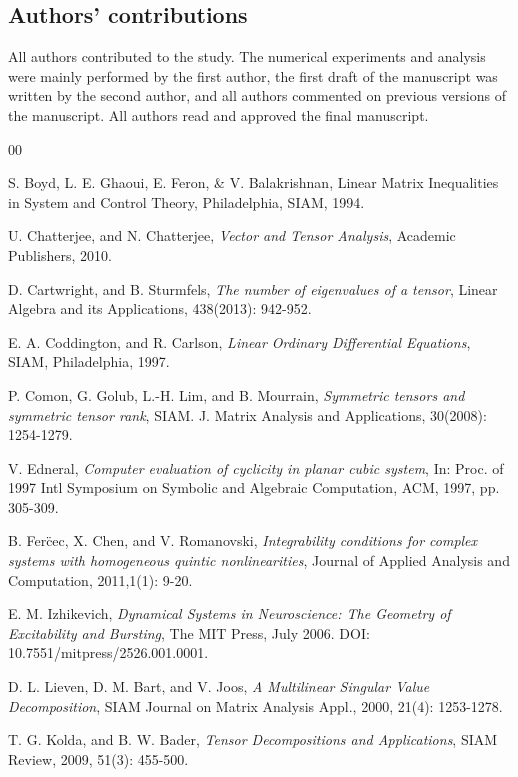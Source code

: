 \documentclass[11pt, oneside]{article}  %
\begin{document}
\subsection*{Authors' contributions}
All authors contributed to the study. The numerical experiments and analysis were mainly performed by the first author, the first draft of the manuscript was written by the second author, and all authors commented on previous versions of the manuscript. All authors read and approved the final manuscript.
 

\begin{thebibliography}{00} 

S. Boyd, L. E. Ghaoui, E. Feron, \& V. Balakrishnan, 
Linear Matrix Inequalities in System and Control Theory, Philadelphia, SIAM, 1994. 

U. Chatterjee, and N. Chatterjee,  
\textit{Vector and Tensor Analysis}, 
Academic Publishers, 2010.  
 
D. Cartwright, and B. Sturmfels, 
\textit{The number of eigenvalues of a tensor}, 
Linear Algebra and its Applications, 438(2013): 942-952.

E. A. Coddington, and R. Carlson, 
\textit{Linear Ordinary Differential Equations}, 
SIAM, Philadelphia, 1997.  

P. Comon, G. Golub, L.-H. Lim, and B. Mourrain, 
\textit{Symmetric tensors and symmetric tensor rank}, 
SIAM. J. Matrix Analysis and Applications, 30(2008): 1254-1279. 

V. Edneral,
\textit{Computer evaluation of cyclicity in planar cubic system}, 
In: Proc. of 1997 Intl Symposium on Symbolic and Algebraic Computation, 
ACM, 1997, pp. 305-309.
 
B. Fer\"{c}ec, X. Chen, and V. Romanovski,
\textit{Integrability conditions for complex systems with homogeneous quintic nonlinearities}, 
Journal of Applied Analysis and Computation, 2011,1(1): 9-20.  

E. M. Izhikevich,
\textit{Dynamical Systems in Neuroscience: The Geometry of Excitability and Bursting},
The MIT Press, July 2006. DOI: 10.7551/mitpress/2526.001.0001. 

D. L. Lieven, D. M. Bart, and V. Joos,
\textit{A Multilinear Singular Value Decomposition},
SIAM Journal on Matrix Analysis Appl., 2000, 21(4): 1253-1278.

T. G. Kolda, and B. W. Bader, 
\textit{Tensor Decompositions and Applications}, 
SIAM Review, 2009, 51(3): 455-500. 


\end{thebibliography}
\end{document}
